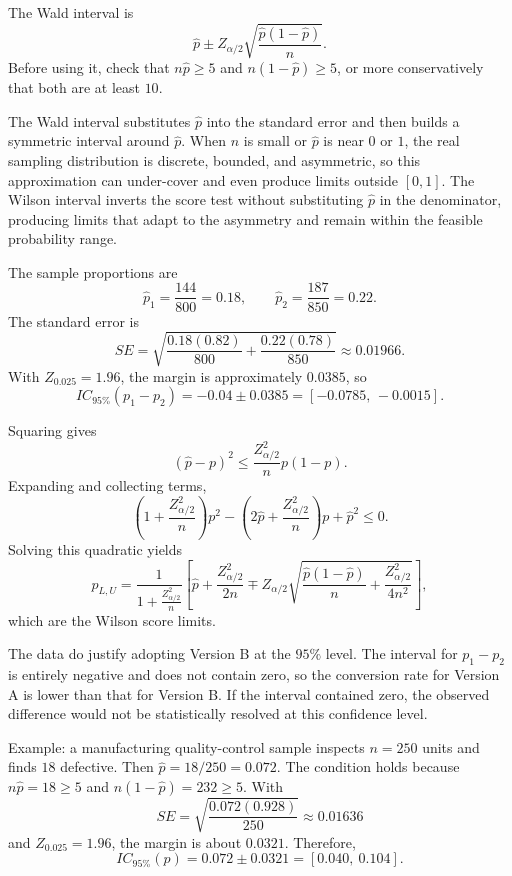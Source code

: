 \begin{solproblema}
The Wald interval is
\[
	\hat p\pm Z_{\alpha/2}\sqrt{\frac{\hat p(1-\hat p)}{n}}.
\]
Before using it, check that $n\hat p\ge5$ and $n(1-\hat p)\ge5$, or more conservatively that both are at least $10$.
\end{solproblema}

\begin{solproblema}[prob:8394415]
The Wald interval substitutes $\hat p$ into the standard error and then builds a symmetric interval around $\hat p$. When $n$ is small or $\hat p$ is near $0$ or $1$, the real sampling distribution is discrete, bounded, and asymmetric, so this approximation can under-cover and even produce limits outside $[0,1]$. The Wilson interval inverts the score test without substituting $\hat p$ in the denominator, producing limits that adapt to the asymmetry and remain within the feasible probability range.
\end{solproblema}

\begin{solproblema}[prob:f92b151]
The sample proportions are
\[
	\hat p_1=\frac{144}{800}=0.18,\qquad
	\hat p_2=\frac{187}{850}=0.22.
\]
The standard error is
\[
	SE=\sqrt{\frac{0.18(0.82)}{800}+\frac{0.22(0.78)}{850}}
	\approx0.01966.
\]
With $Z_{0.025}=1.96$, the margin is approximately $0.0385$, so
\[
	IC_{95\%}(p_1-p_2)=-0.04\pm0.0385=[-0.0785,\,-0.0015].
\]
\end{solproblema}

\begin{solproblema}[prob:2bf037d]
Squaring gives
\[
	(\hat p-p)^2\le\frac{Z_{\alpha/2}^2}{n}p(1-p).
\]
Expanding and collecting terms,
\[
	\left(1+\frac{Z_{\alpha/2}^2}{n}\right)p^2
	-\left(2\hat p+\frac{Z_{\alpha/2}^2}{n}\right)p
	+\hat p^2\le0.
\]
Solving this quadratic yields
\[
	p_{L,U}=\frac{1}{1+\frac{Z_{\alpha/2}^2}{n}}
	\left[\hat p+\frac{Z_{\alpha/2}^2}{2n}
	\mp Z_{\alpha/2}\sqrt{\frac{\hat p(1-\hat p)}n+\frac{Z_{\alpha/2}^2}{4n^2}}\right],
\]
which are the Wilson score limits.
\end{solproblema}

\begin{solproblema}[prob:816285e]
The data do justify adopting Version B at the $95\%$ level. The interval for $p_1-p_2$ is entirely negative and does not contain zero, so the conversion rate for Version A is lower than that for Version B. If the interval contained zero, the observed difference would not be statistically resolved at this confidence level.
\end{solproblema}

\begin{solproblema}[prob:e10df82]
Example: a manufacturing quality-control sample inspects $n=250$ units and finds $18$ defective. Then $\hat p=18/250=0.072$. The condition holds because $n\hat p=18\ge5$ and $n(1-\hat p)=232\ge5$. With
\[
	SE=\sqrt{\frac{0.072(0.928)}{250}}\approx0.01636
\]
and $Z_{0.025}=1.96$, the margin is about $0.0321$. Therefore,
\[
	IC_{95\%}(p)=0.072\pm0.0321=[0.040,\ 0.104].
\]
\end{solproblema}
